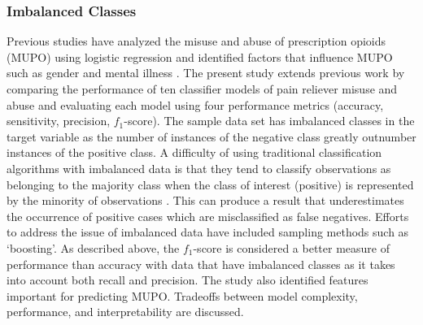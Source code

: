 \documentclass[sigconf]{acmart}
\begin{document}

\subsubsection{Imbalanced Classes}

Previous studies have analyzed the misuse and abuse of prescription opioids
(MUPO) using logistic regression and identified factors that influence MUPO 
such as gender and mental illness \cite{rice12, unick13, jones15, mccabe12}. 
The present study extends previous work by comparing the performance of ten 
classifier models of pain reliever misuse and abuse and evaluating each model 
using four performance metrics (accuracy, sensitivity, precision, $f_1$-score). 
The sample data set has imbalanced classes in the target variable as the 
number of instances of the negative class greatly outnumber instances of 
the positive class. A difficulty of using traditional classification 
algorithms with imbalanced data is that they tend to classify observations
as belonging to the majority class when the class of interest (positive) is 
represented by the minority of observations \cite{brown12, yun09}. This can 
produce a result that underestimates the occurrence of positive cases which 
are misclassified as false negatives. Efforts to address the issue of 
imbalanced data have included sampling methods such as `boosting'. 
As described above, the $f_1$-score is considered a better measure of 
performance than accuracy with data that have imbalanced classes as it 
takes into account both recall and precision. The study also identified 
features important for predicting MUPO. Tradeoffs between model complexity,
performance, and interpretability are discussed. 







 
\end{document}
